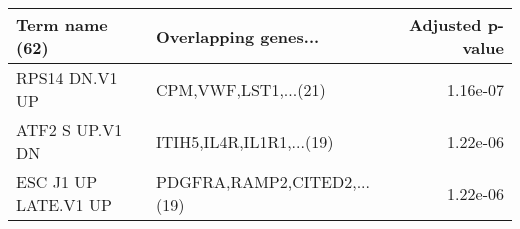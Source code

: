 \begin{tabular}{llr}
\toprule
      Term name (62) &        Overlapping genes... &  Adjusted p-value \\
\midrule
      RPS14 DN.V1 UP &        CPM,VWF,LST1,...(21) &          1.16e-07 \\
     ATF2 S UP.V1 DN &    ITIH5,IL4R,IL1R1,...(19) &          1.22e-06 \\
ESC J1 UP LATE.V1 UP & PDGFRA,RAMP2,CITED2,...(19) &          1.22e-06 \\
\bottomrule
\end{tabular}
